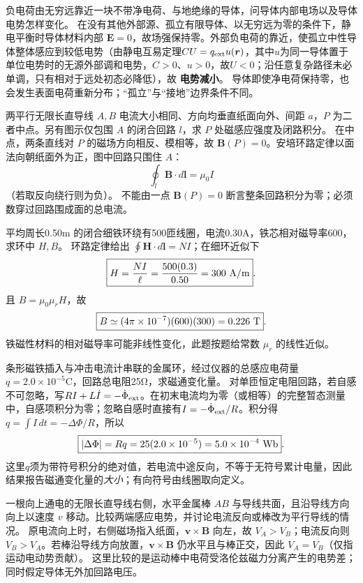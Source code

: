 \problemtext 负电荷由无穷远靠近一块不带净电荷、与地绝缘的导体，问导体内部电场以及导体电势怎样变化。
\workings 在没有其他外部源、孤立有限导体、以无穷远为零的条件下，静电平衡时导体材料内部 $\boxed{\bm E=0}$，故场强保持零。外部负电荷的靠近，使孤立中性导体整体感应到较低电势（由静电互易定理$CU=q_{\rm ext}u(\bm r)$，其中$u$为同一导体置于单位电势时的无源外部调和电势，$C>0$、$u>0$，故$U<0$；沿任意复杂路径未必单调，只有相对于远处初态必降低），故 \textbf{电势减小}。
\crosscheck 导体即使净电荷保持零，也会发生表面电荷重新分布；“孤立”与“接地”边界条件不同。

\problemtext 两平行无限长直导线 $A,B$ 电流大小相同、方向均垂直纸面向外、间距 $a$，$P$ 为二者中点。另有图示仅包围 $A$ 的闭合回路 $l$，求 $P$ 处磁感应强度及闭路积分。
\workings 在中点，两条直线对 $P$ 的磁场方向相反、模相等，故 $\boxed{\bm B(P)=0}$。安培环路定律以面法向朝纸面外为正，图中回路只围住 $A$：
\[\boxed{\oint_l\bm B\cdot d\bm l=\mu_0 I}\]
（若取反向绕行则为负）。
\crosscheck 不能由一点 $\bm B(P)=0$ 断言整条回路积分为零；必须数穿过回路围成面的总电流。

\problemtext 平均周长0.50m 的闭合细铁环绕有500匝线圈，电流0.30A，铁芯相对磁导率600，求环中 $H,B$。
\workings 环路定律给出 $\oint\bm H\cdot d\bm l=NI$；在细环近似下
\[\boxed{H=\frac{NI}{\ell}=\frac{500(0.3)}{0.50}=300\ {\rm A/m}}.\]
且 $B=\mu_0\mu_rH$，故
\[\boxed{B\simeq(4\pi\times10^{-7})(600)(300)=0.226\ {\rm T}}.\]
\crosscheck 铁磁性材料的相对磁导率可能非线性变化，此题按题给常数 $\mu_r$ 的线性近似。

\problemtext 条形磁铁插入与冲击电流计串联的金属环，经过仪器的总感应电荷量 $q=2.0\times10^{-5}$C，回路总电阻25Ω，求磁通变化量。
\workings 对单匝恒定电阻回路，若自感不可忽略，写$RI+L\dot I=-\dot\Phi_{\rm ext}$。在初末电流均为零（或相等）的完整暂态测量中，自感项积分为零；忽略自感时直接有$I=-\dot\Phi_{\rm ext}/R$。积分得 $q=\int I\,dt=-\Delta\Phi/R$，所以
\[\boxed{|\Delta\Phi|=Rq=25(2.0\times10^{-5})=5.0\times10^{-4}\ {\rm Wb}}.\]
\crosscheck 这里$q$须为带符号积分的绝对值，若电流中途反向，不等于无符号累计电量，因此结果报告磁通变化量的\emph{大小}；有向符号由线圈取向定义。

\problemtext 一根向上通电的无限长直导线右侧，水平金属棒 $AB$ 与导线共面，且沿导线方向向上以速度 $v$ 移动。比较两端感应电势，并讨论电流反向或棒改为平行导线的情况。
\workings 原电流向上时，右侧磁场指入纸面，$\bm v\times\bm B$ 向左，故 \textbf{$V_A>V_B$}；电流反向则 \textbf{$V_B>V_A$}。若棒沿导线方向放置，$\bm v\times\bm B$ 仍水平且与棒正交，因此 $\boxed{V_A=V_B}$（仅指运动电动势贡献）。
\crosscheck 这里比较的是运动棒中电荷受洛伦兹磁力分离产生的电势差；同时假定导体无外加回路电压。

